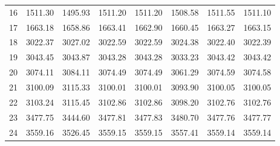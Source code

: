 \documentclass[10pt,oneside]{article}
\begin{document}
\begin{table}[h!]
\begin{tabular}{cccccccc}
16 &   1511.30 & 1495.93 & 1511.20 & 1511.20 &      1508.58 & 1511.55 & 1511.10 \\
17 &   1663.18 & 1658.86 & 1663.41 & 1662.90 &      1660.45 & 1663.27 & 1663.15 \\
18 &   3022.37 & 3027.02 & 3022.59 & 3022.59 &      3024.38 & 3022.40 & 3022.39 \\
19 &   3043.45 & 3043.87 & 3043.28 & 3043.28 &      3033.23 & 3043.42 & 3043.42 \\
20 &   3074.11 & 3084.11 & 3074.49 & 3074.49 &      3061.29 & 3074.59 & 3074.58 \\
21 &   3100.09 & 3115.33 & 3100.01 & 3100.01 &      3093.90 & 3100.05 & 3100.05 \\
22 &   3103.24 & 3115.45 & 3102.86 & 3102.86 &      3098.20 & 3102.76 & 3102.76 \\
23 &   3477.75 & 3444.60 & 3477.81 & 3477.83 &      3480.70 & 3477.76 & 3477.77 \\
24 &   3559.16 & 3526.45 & 3559.15 & 3559.15 &      3557.41 & 3559.14 & 3559.14 \\
\bottomrule
\end{tabular}
\end{table}

\clearpage
\end{document}
